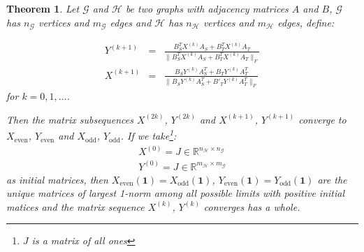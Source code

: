 \documentclass[a4paper,11pt]{report}
\newtheorem{theorem}{Theorem}[section]
\newcommand{\R}{{\mathbb R}}
\newcommand{\graf}{\mathscr{G}}
\newcommand{\grafeen}{\mathscr{H}}
\begin{document}
 \begin{theorem}\label{edgegrootbewijs}
   Let $\graf$ and $\grafeen$ be two graphs with adjacency matrices $A$ and $B$, $\graf$ has $n_\graf$ vertices and
   $m_\graf$ edges and $\grafeen$ has $n_\grafeen$ vertices and $m_\grafeen$ edges, define: 


   
 \begin{eqnarray}
  Y^{(k+1)} &=& \frac{B_S^TX^{(k)}A_S + B_T^TX^{(k)}A_T}{\|B_S^TX^{(k)}A_S + 
  B_T^TX^{(k)}A_T\|_F}\label{edgegroot1}\\
   X^{(k+1)} &=& \frac{B_SY^{(k)}A_S^T + B_TY^{(k)}A^T_T}{\|B_SY^{(k)}A_S^T + 
   B'_TY^{(k)}A^T_T\|_F}\label{edgegroot2}
 \end{eqnarray}
  for  $k =  0,1,\ldots$.
  
  Then the matrix subsequences $X^{(2k)}$, $Y^{(2k)}$ and $X^{(k+1)}$, $Y^{(k+1)}$ 
  converge to $X_{\text{even}}$, $Y_{\text{even}}$ and $X_{\text{odd}}$, 
  $Y_{\text{odd}}$. If we take\footnote{$J$ is a matrix of all ones}:
  \begin{eqnarray*}  X^{(0)} = J \in \R^{n_\grafeen \times n_\graf}\\
    Y^{(0)} = J \in \R^{m_\grafeen \times m_\graf}
  \end{eqnarray*}
 as initial matrices, then $X_{\text{even}}(\mathbf{1})=X_{\text{odd}}(\mathbf{1})$, $Y_{\text{even}}(\mathbf{1})= Y_{\text{odd}}(\mathbf{1})$ 
 are the unique matrices of largest 1-norm among all possible limits with positive 
 initial matices and the matrix sequence $X^{(k)}$, $Y^{(k)}$ converges has a 
 whole.
  \end{theorem}
\end{document}
